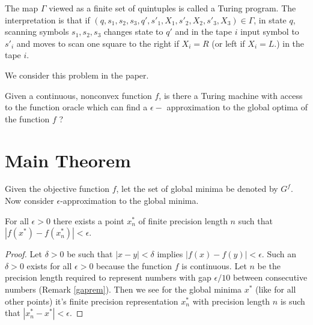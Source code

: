 	\begin{remark}
		The map $\Gamma$ viewed as a finite set of quintuples is called a Turing program. The interpretation is that if $(q,s_1,s_2,s_3,q',s'_1,X_1,s'_2,X_2,s'_3,X_3) \in \Gamma$, in state $q$, scanning symbols $s_1, s_2, s_3$ changes state to $q'$ and in the tape $i$ input symbol to $s'_i$ and moves to scan one square to the right if $X_i=R$ (or left if $X_i=L$.) in the tape $i$.	
	\end{remark}
	
	We consider this problem in the paper.
	
	\begin{problem}
		Given a continuous, nonconvex function $f$, is there a Turing machine with access to the function oracle which can find a $\epsilon-$ approximation to the global optima of the function $f$ ?
	\end{problem}
	
	\section{Main Theorem}
	
	Given the objective function $f$, let the set of global minima be denoted by $G^f$. Now consider $\epsilon$-approximation to the global minima.  %
	
	\begin{lemma}\label{preclem}
		For all $\epsilon > 0$ there exists a point $x_n^*$ of finite precision length $n$ such that $|f(x^*)-f(x_n^*)| < \epsilon$. 
	\end{lemma}
	
	\begin{proof}
		Let $\delta > 0$ be such that $|x-y| < \delta$ implies $|f(x)-f(y)| < \epsilon$. Such an $\delta > 0$ exists for all $\epsilon > 0$ because the function $f$ is continuous. Let $n$ be the precision length required to represent numbers with gap $\epsilon/10$ between consecutive numbers (Remark \ref{gaprem}). Then we see for the global minima $x^*$ (like for all other points) it's finite precision representation $x_n^*$ with precision length $n$ is such that $|x_n^*-x^*|<\epsilon$. 
	\end{proof}
	
